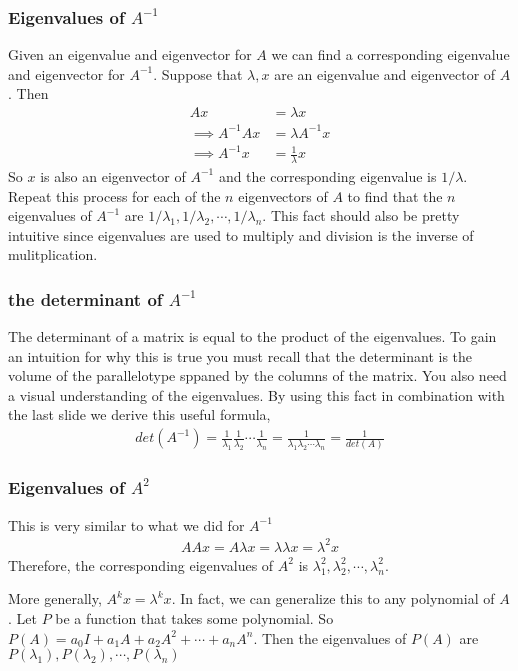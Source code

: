 \documentclass{beamer}
\theoremstyle{definition}
\renewcommand{\=}{&=&}
\newcommand{\<}{\langle}
\renewcommand{\>}{\rangle}
\begin{document}
\begin{frame}[t]
\frametitle{Eigenvalues of $A^{-1}$}
Given an eigenvalue and eigenvector for $A$ we can find a corresponding
eigenvalue and eigenvector for $A^{-1}$. Suppose that $\lambda, x$ are an eigenvalue
and eigenvector of $A$. Then 
\begin{align*}
  Ax &= \lambda x \\
  \implies A^{-1}A x &= \lambda A^{-1} x \\
  \implies A^{-1} x &= \frac{1}{\lambda} x
\end{align*}
So $x$ is also an eigenvector of $A^{-1}$ and the corresponding eigenvalue is $1/\lambda$.
Repeat this process for each of the $n$ eigenvectors of $A$ to find that the $n$
eigenvalues of $A^{-1}$ are $1/\lambda_1, 1/\lambda_2, \cdots, 1/\lambda_n$.
This fact should also be pretty intuitive since eigenvalues are used to multiply
and division is the inverse of mulitplication.
\end{frame}
\begin{frame}[t]
\frametitle{the determinant of $A^{-1}$}
The determinant of a matrix is equal to the product of the eigenvalues. To gain an
intuition for why this is true you must recall that the determinant is the
volume of the parallelotype sppaned by the columns of the matrix. You also need
a visual understanding of the eigenvalues. By using
this fact in combination with the last slide we derive this useful formula,
\begin{align*}
  det(A^{-1}) = \frac{1}{\lambda_1}\frac{1}{\lambda_2}\cdots\frac{1}{\lambda_n} = \frac{1}{\lambda_1\lambda_2\cdots\lambda_n} = \frac{1}{det(A)}
\end{align*}

\end{frame}
\begin{frame}[t]
\frametitle{Eigenvalues of $A^2$}
This is very similar to what we did for $A^{-1}$
\begin{align*}
  AAx = A \lambda x = \lambda \lambda x = \lambda^2 x
\end{align*}
Therefore, the corresponding eigenvalues of $A^2$ is $\lambda_1^2, \lambda_2^2, \cdots, \lambda_n^2$.

More generally, $A^k x = \lambda^k x$. In fact, we can generalize this to any
polynomial of $A$.
Let $P$ be a function that takes some polynomial.
So $P(A) = a_0 I + a_1A + a_2A^2 + \cdots + a_nA^n$.
Then the eigenvalues of $P(A)$ are $P(\lambda_1), P(\lambda_2), \cdots, P(\lambda_n)$
\end{frame}
\end{document}
